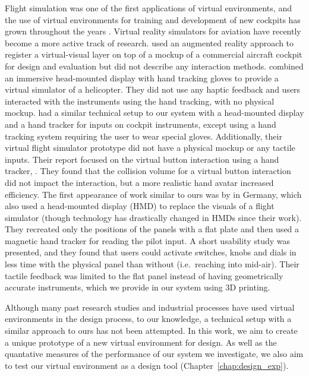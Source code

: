 Flight simulation was one of the first applications of virtual environments, and the use of virtual environments for training and development of new cockpits has grown throughout the years \citep{hancock_human_2008}.
Virtual reality simulators for aviation have recently become a more active track of research.
\citet{wan_mrstudio:_2011} used an augmented reality approach to register a virtual-visual layer on top of a mockup of a commercial aircraft cockpit for design and evaluation but did not describe any interaction methods.
\citet{yavrucuk_low_2011} combined an immersive head-mounted display with hand tracking gloves to provide a virtual simulator of a helicopter.
They did not use any haptic feedback and users interacted with the instruments using the hand tracking, with no physical mockup.
\citet{aslandere_virtual_2015} had a similar technical setup to our system with a head-mounted display and a hand tracker for inputs on cockpit instruments, except using a hand tracking system requiring the user to wear special gloves.
Additionally, their virtual flight simulator prototype did not have a physical mockup or any tactile inputs.
Their report focused on the virtual button interaction using a hand tracker, .
They found that the collision volume for a virtual button interaction did not impact the interaction, but a more realistic hand avatar increased efficiency.
The first appearance of work similar to ours was by \citet{schiefele_simple_1998} in Germany, which also used a head-mounted display (HMD) to replace the visuals of a flight simulator (though technology has drastically changed in HMDs since their work).
They recreated only the positions of the panels with a flat plate and then used a magnetic hand tracker for reading the pilot input.
A short usability study was presented, and they found that users could activate switches, knobs and dials in less time with the physical panel than without (i.e.\ reaching into mid-air).
Their tactile feedback was limited to the flat panel instead of having geometrically accurate instruments, which we provide in our system using 3D printing.

Although many past research studies and industrial processes have used virtual environments in the design process, to our knowledge, a technical setup with a similar approach to ours has not been attempted.
In this work, we aim to create a unique prototype of a new virtual environment for design.
As well as the quantative measures of the performance of our system we investigate, we also aim to test our virtual environment as a design tool (Chapter~\ref{chap:design_exp}).

